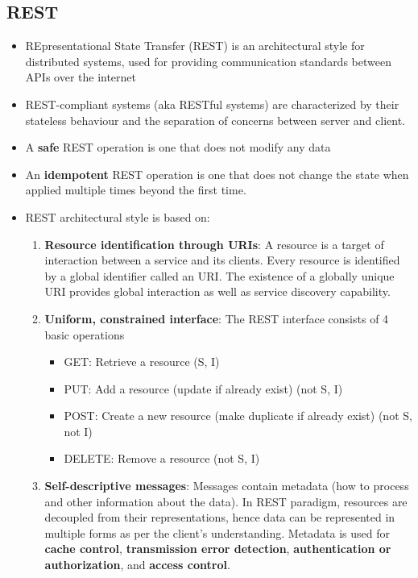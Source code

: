\documentclass{article}
\begin{document}
\subsection{REST}
\begin{itemize}
    \item REpresentational State Transfer (REST) is an architectural style for distributed systems, used for providing communication standards between APIs over the internet
    
    \item REST-compliant systems (aka RESTful systems) are characterized by their stateless behaviour and the separation of concerns between server and client. 
    
    \item A \textbf{safe} REST operation is one that does not modify any data
    
    \item An \textbf{idempotent} REST operation is one that does not change the state when applied multiple times beyond the first time.
    
    \item REST architectural style is based on:
    \begin{enumerate}
        \item \textbf{Resource identification through URIs}: A resource is a target of interaction between a service and its clients. Every resource is identified by a global identifier called an URI. The existence of a globally unique URI provides global interaction as well as service discovery capability. 
        
        \item \textbf{Uniform, constrained interface}: The REST interface consists of 4 basic operations
        \begin{itemize}
            \item GET: Retrieve a resource (S, I)
            \item PUT: Add a resource (update if already exist) (not S, I)
            \item POST: Create a new resource (make duplicate if already exist) (not S, not I)
            \item DELETE: Remove a resource (not S, I)
        \end{itemize}
        
        \item \textbf{Self-descriptive messages}: Messages contain metadata (how to process and other information about the data). In REST paradigm, resources are decoupled from their representations, hence data can be represented in multiple forms as per the client's understanding. Metadata is used for \textbf{cache control}, \textbf{transmission error detection}, \textbf{authentication or authorization}, and \textbf{access control}.
        

\end{enumerate}
\end{itemize}
\end{document}
